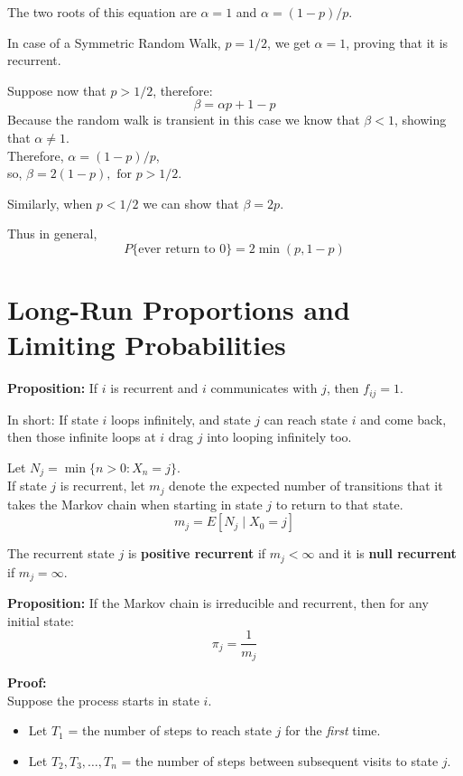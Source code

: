 \documentclass[12pt,a4paper]{article}
\begin{document}
The two roots of this equation are $\alpha = 1$ and $\alpha = (1-p)/p$.

In case of a Symmetric Random Walk, $p = 1/2$, we get $\alpha = 1$, proving that it is recurrent.

Suppose now that $p > 1/2$, therefore:
\[ \beta = \alpha p + 1 - p \]
Because the random walk is transient in this case we know that $\beta < 1$, showing that $\alpha \ne 1$. \\
Therefore, $\alpha = (1 - p)/p$, \\
so, $\beta = 2(1 - p), \text{ for } p > 1/2$.

Similarly, when $p < 1/2$ we can show that $\beta = 2p$.

Thus in general,
\[ P\{\text{ever return to } 0\} = 2 \min(p, 1 - p) \]

\vspace{0.5cm}
\newpage
\section*{\textcolor{secondary}{Long-Run Proportions and Limiting Probabilities}}

\textbf{Proposition:} If $i$ is recurrent and $i$ communicates with $j$, then $f_{ij} = 1$.

In short: If state $i$ loops infinitely, and state $j$ can reach state $i$ and come back, then those infinite loops at $i$ drag $j$ into looping infinitely too.

Let $N_j = \min\{n > 0 : X_n = j\}$. \\
If state $j$ is recurrent, let $m_j$ denote the expected number of transitions that it takes the Markov chain when starting in state $j$ to return to that state.
\[ m_j = E[N_j \mid X_0 = j] \]

The recurrent state $j$ is \textbf{positive recurrent} if $m_j < \infty$ and it is \textbf{null recurrent} if $m_j = \infty$.

\textbf{Proposition:} If the Markov chain is irreducible and recurrent, then for any initial state:
\[ \pi_j = \frac{1}{m_j} \]

\textbf{Proof:} \\
Suppose the process starts in state $i$.
\begin{itemize}
    \item Let $T_1$ = the number of steps to reach state $j$ for the \textit{first} time.
    \item Let $T_2, T_3, \dots, T_n$ = the number of steps between subsequent visits to state $j$.
\end{itemize}
\end{document}
